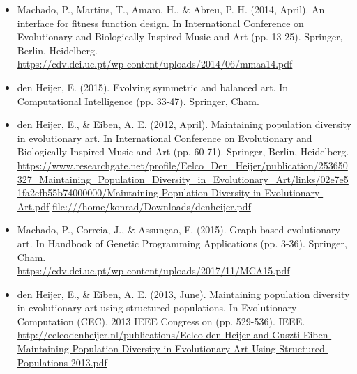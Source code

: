 \documentclass[10pt,a4paper]{article}
\begin{document}
\begin{itemize}
	\item Machado, P., Martins, T., Amaro, H., \& Abreu, P. H. (2014, April). An interface for fitness function design. In International Conference on Evolutionary and Biologically Inspired Music and Art (pp. 13-25). Springer, Berlin, Heidelberg.
	\\
	\url{https://cdv.dei.uc.pt/wp-content/uploads/2014/06/mmaa14.pdf}
	
	\item den Heijer, E. (2015). Evolving symmetric and balanced art. In Computational Intelligence (pp. 33-47). Springer, Cham.
	
	\item den Heijer, E., \& Eiben, A. E. (2012, April). Maintaining population diversity in evolutionary art. In International Conference on Evolutionary and Biologically Inspired Music and Art (pp. 60-71). Springer, Berlin, Heidelberg.
	\\
	\url{https://www.researchgate.net/profile/Eelco_Den_Heijer/publication/253650327_Maintaining_Population_Diversity_in_Evolutionary_Art/links/02e7e51fa2efb55b74000000/Maintaining-Population-Diversity-in-Evolutionary-Art.pdf}
	\url{file:///home/konrad/Downloads/denheijer.pdf}
	
	\item Machado, P., Correia, J., \& Assunçao, F. (2015). Graph-based evolutionary art. In Handbook of Genetic Programming Applications (pp. 3-36). Springer, Cham.
	\\
	\url{https://cdv.dei.uc.pt/wp-content/uploads/2017/11/MCA15.pdf}
	
	\item den Heijer, E., \& Eiben, A. E. (2013, June). Maintaining population diversity in evolutionary art using structured populations. In Evolutionary Computation (CEC), 2013 IEEE Congress on (pp. 529-536). IEEE.
	\\
	\url{http://eelcodenheijer.nl/publications/Eelco-den-Heijer-and-Guszti-Eiben-Maintaining-Population-Diversity-in-Evolutionary-Art-Using-Structured-Populations-2013.pdf}
	
	
\end{itemize}
\end{document}
